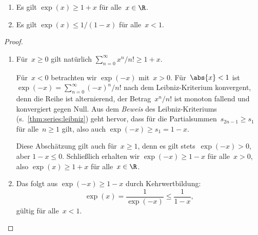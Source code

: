 \documentclass[a4paper]{article}
\begin{document}
\begin{proposition}\label{prop:exponential:estimate}\leavevmode
    \begin{enumerate}
        \item Es gilt $\exp(x) \geq 1+x$ für alle~$x \in \R$.
        \item Es gilt $\exp(x) \leq 1/(1-x)$ für alle~$x < 1$.
    \end{enumerate}
\end{proposition}

\begin{proof}\leavevmode
    \begin{enumerate}
        \item Für~$x \geq 0$ gilt natürlich $\sum_{n=0}^\infty x^n/n! \geq 1+x$.
        
        Für~$x < 0$ betrachten wir $\exp(-x)$ mit~$x > 0$. Für~$\abs{x} < 1$ ist $\exp(-x) = \sum_{n=0}^\infty (-x)^n/n!$ nach dem Leibniz-Kriterium konvergent, denn die Reihe ist alternierend, der Betrag~$x^n/n!$ ist monoton fallend und konvergiert gegen Null. Aus dem \emph{Beweis} des Leibniz-Kriteriums (s.~\cref{thm:series:leibniz}) geht hervor, dass für die Partialsummen~$s_{2n-1} \geq s_1$ für alle~$n \geq 1$ gilt, also auch $\exp(-x) \geq s_1 = 1-x$.

        Diese Abschätzung gilt auch für~$x \geq 1$, denn es gilt stets~$\exp(-x) > 0$, aber $1-x \leq 0$. Schließlich erhalten wir $\exp(-x) \geq 1-x$ für alle~$x > 0$, also $\exp(x) \geq 1+x$ für alle~$x \in \R$.
        \item Das folgt aus $\exp(-x) \geq 1-x$ durch Kehrwertbildung:
        \begin{equation*}
            \exp(x) = \frac{1}{\exp(-x)} \leq \frac{1}{1-x},
        \end{equation*}
        gültig für alle~$x < 1$.\qedhere
    \end{enumerate}
\end{proof}

\begin{center}
\end{center}
\end{document}
